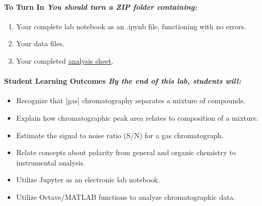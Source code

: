 \documentclass[]{tufte-book}
\providecommand{\tightlist}{%
  \setlength{\itemsep}{0pt}\setlength{\parskip}{0pt}}
\begin{document}
\hypertarget{to-turn-in-you-should-turn-a-zip-folder-containing-2}{%
\paragraph{\texorpdfstring{\textbf{To Turn In} \textbar{} \emph{You should turn a ZIP folder containing:}}{To Turn In \textbar{} You should turn a ZIP folder containing:}}\label{to-turn-in-you-should-turn-a-zip-folder-containing-2}}

\begin{enumerate}
\def\labelenumi{\arabic{enumi}.}
\tightlist
\item
  Your complete lab notebook as an .ipynb file, functioning with no errors.\\
\item
  Your data files.\\
\item
  Your completed \href{https://github.com/alphonse/alphonse.github.io/raw/master/devel/chem370/assignments/excel-templates/lab2_gctcd_data-analysis.xlsx}{analysis sheet}.
\end{enumerate}

\hypertarget{student-learning-outcomes-by-the-end-of-this-lab-students-will-2}{%
\paragraph{\texorpdfstring{\textbf{Student Learning Outcomes} \textbar{} \emph{By the end of this lab, students will:}}{Student Learning Outcomes \textbar{} By the end of this lab, students will:}}\label{student-learning-outcomes-by-the-end-of-this-lab-students-will-2}}

\begin{itemize}
\tightlist
\item
  Recognize that {[}gas{]} chromatography separates a mixture of compounds.\\
\item
  Explain how chromatographic peak area relates to composition of a mixture.\\
\item
  Estimate the signal to noise ratio (S/N) for a gas chromatograph.
\item
  Relate concepts about polarity from general and organic chemistry to instrumental analysis.\\
\item
  Utilize Jupyter as an electronic lab notebook.
\item
  Utilize Octave/MATLAB functions to analyze chromatographic data.
\end{itemize}
\end{document}
